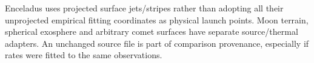 Enceladus uses projected surface jets/stripes rather than adopting all their
unprojected empirical fitting coordinates as physical launch points.
Moon terrain, spherical exosphere and arbitrary comet surfaces have separate
source/thermal adapters. An unchanged source file is part of comparison
provenance, especially if rates were fitted to the same observations.
